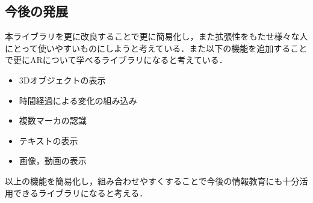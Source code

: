 \subsection{今後の発展}
本ライブラリを更に改良することで更に簡易化し，また拡張性をもたせ様々な人にとって使いやすいものにしようと考えている．また以下の機能を追加することで更にARについて学べるライブラリになると考えている．

\begin{itemize}
 \item 3Dオブジェクトの表示
 \item 時間経過による変化の組み込み
 \item 複数マーカの認識
 \item テキストの表示
 \item 画像，動画の表示
\end{itemize}

以上の機能を簡易化し，組み合わせやすくすることで今後の情報教育にも十分活用できるライブラリになると考える．